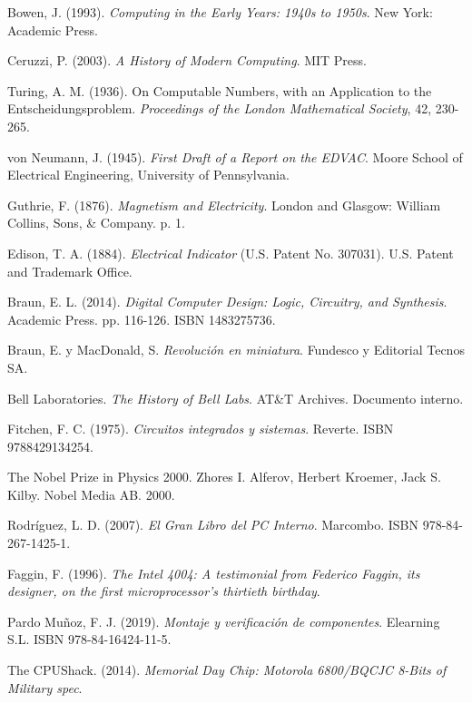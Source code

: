 \documentclass[]{article}
\begin{document}
\begin{thebibliography}{9}

Bowen, J. (1993). \textit{Computing in the Early Years: 1940s to 1950s}. New York: Academic Press.

Ceruzzi, P. (2003). \textit{A History of Modern Computing}. MIT Press.

Turing, A. M. (1936). On Computable Numbers, with an Application to the Entscheidungsproblem. \textit{Proceedings of the London Mathematical Society}, 42, 230-265.

von Neumann, J. (1945). \textit{First Draft of a Report on the EDVAC}. Moore School of Electrical Engineering, University of Pennsylvania.

    Guthrie, F. (1876). \textit{Magnetism and Electricity}. London and Glasgow: William Collins, Sons, \& Company. p. 1.
    
Edison, T. A. (1884). \textit{Electrical Indicator} (U.S. Patent No. 307031). U.S. Patent and Trademark Office.

Braun, E. L. (2014). \textit{Digital Computer Design: Logic, Circuitry, and Synthesis}. Academic Press. pp. 116-126. ISBN 1483275736.

Braun, E. y MacDonald, S. \textit{Revolución en miniatura}. Fundesco y Editorial Tecnos SA.

Bell Laboratories. \textit{The History of Bell Labs}. AT\&T Archives. Documento interno.

Fitchen, F. C. (1975). \textit{Circuitos integrados y sistemas}. Reverte. ISBN 9788429134254.

The Nobel Prize in Physics 2000. Zhores I. Alferov, Herbert Kroemer, Jack S. Kilby. Nobel Media AB. 2000.

Rodríguez, L. D. (2007). \textit{El Gran Libro del PC Interno}. Marcombo. ISBN 978-84-267-1425-1.

Faggin, F. (1996). \textit{The Intel 4004: A testimonial from Federico Faggin, its designer, on the first microprocessor's thirtieth birthday}.

Pardo Muñoz, F. J. (2019). \textit{Montaje y verificación de componentes}. Elearning S.L. ISBN 978-84-16424-11-5.

The CPUShack. (2014). \textit{Memorial Day Chip: Motorola 6800/BQCJC 8-Bits of Military spec}.


\end{thebibliography}
\end{document}

